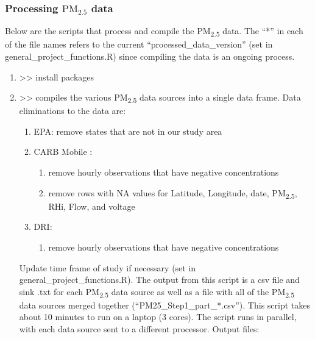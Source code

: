 
\subsubsection{Processing $\textrm{PM}_{2.5}$ data}

Below are the scripts that process and compile the PM\textsubscript{2.5} data. The ``*'' in each of the file names refers to the current ``processed\_data\_version'' (set in general\_project\_functions.R)  since compiling the data is an ongoing process. 

\begin{enumerate}[nolistsep]
\item {} >> install packages

\item {} >> compiles the various PM\textsubscript{2.5} data sources into a single data frame. Data eliminations to the data are:

\begin{enumerate}[nolistsep]
\item EPA: remove states that are not in our study area
\item CARB Mobile :
	\begin{enumerate}[nolistsep]
	\item remove hourly observations that have negative concentrations
	\item remove rows with NA values for Latitude, Longitude, date, PM\textsubscript{2.5}, RHi, Flow, and voltage
	\end{enumerate}
\item DRI:
	\begin{enumerate}[nolistsep]
	\item remove hourly observations that have negative concentrations
	\end{enumerate}
\end{enumerate}


 Update time frame of study if necessary (set in general\_project\_functions.R). The output from this script is a csv file and sink .txt for each  PM\textsubscript{2.5} data source as well as a file with all of the PM\textsubscript{2.5} data sources merged together (``PM25\_Step1\_part\_*.csv''). This script takes about 10 minutes to run on a laptop (3 cores). The script runs in parallel, with each data source sent to a different processor. Output files: %


\end{enumerate}
